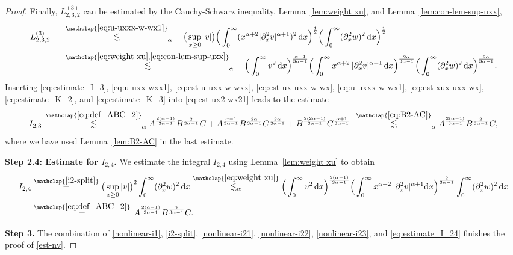 \documentclass[reqno,12pt]{amsart}
\renewcommand{\d}{\ensuremath{\mathrm{d}}}
\renewcommand{\d}{\ensuremath{{\rm d}}}
\numberwithin{equation}{section}
\begin{document}
\begin{proof}
Finally, $ L_{2,3,2}^{(3)}$ can be estimated by the Cauchy-Schwarz inequality, Lemma~\ref{lem:weight xu}, and Lemma~\ref{lem:con-lem-sup-uxx},
\begin{align} \label{eq:estimate_K_3}
  L_{2,3,2}^{(3)} \;
    \quad\;&\stackrel{\mathclap{\eqref{eq:u-uxxx-w-wx1}}}{\lesssim}_{\alpha}\quad \big(\sup_{x \ge 0} |v|\big) \Big(\int_0^\infty (x^{\alpha+2} |\partial_x^2 v|^{\alpha+1})^2 \, \d x\Big)^{\frac 1 2} \Big(\int_0^\infty (\partial_x^2 w)^2 \, \d x\Big)^{\frac 1 2} \nonumber \\
    &\stackrel{\mathclap{\eqref{eq:weight xu},\eqref{eq:con-lem-sup-uxx}}}{\lesssim}_\alpha \quad 
    \Big(\int_0^\infty v^2\, \d x\Big)^\frac{\alpha-1}{3\alpha-1}
    \Big(  \int_0^\infty x^{\alpha +2} \, |\partial_x^2 v|^{\alpha +1} \, \d x\Big)^{\frac{2\alpha}{3\alpha-1}}
    \Big( \int_0^\infty (\partial_x^2 w)^2 \, \d x\Big)^{\frac{2\alpha}{3\alpha-1}}.
\end{align}
%
Inserting \eqref{eq:estimate_I_3}, \eqref{eq:u-uxx-wxx1}, \eqref{eq:est-u-uxx-w-wxx}, \eqref{eq:est-ux-uxx-w-wx}, \eqref{eq:u-uxxx-w-wx1}, \eqref{eq:est-xux-uxx-wx}, \eqref{eq:estimate_K_2}, and \eqref{eq:estimate_K_3} into \eqref{eq:est-ux2-wx21} leads to the estimate
%
\begin{equation}\label{nonlinear-i23}
    I_{2,3}
    \, \stackrel{\mathclap{\eqref{eq:def_ABC_2}}}{\lesssim}_{\alpha}
    A^\frac{2(\alpha-1)}{3\alpha-1} B^\frac{2}{3\alpha-1}
    C
    +
    A^\frac{\alpha-1}{3\alpha-1}
    B^{\frac{2\alpha}{3\alpha-1}}
    C^{\frac{2\alpha}{3\alpha-1}} 
    +
    B^{\frac{2(2\alpha-1)}{3\alpha-1}}
    C^{\frac{\alpha+1}{3\alpha-1}} \;\, \stackrel{\mathclap{\eqref{eq:B2-AC}}}{\lesssim}_\alpha A^\frac{2(\alpha-1)}{3\alpha-1} B^\frac{2}{3\alpha-1}
    C,
\end{equation}
%
where we have used Lemma~\ref{lem:B2-AC} in the last estimate.

%
\bigskip
%

\noindent\textbf{Step 2.4: Estimate for $I_{2,4}$. }
We estimate the integral $I_{2,4}$ using Lemma~\ref{lem:weight xu} to obtain 
%
\begin{align} \label{eq:estimate_I_24}
    I_{2,4}
    &\stackrel{\mathclap{\eqref{i2-split}}}{=}
    \big(\sup_{x\geq 0} |v|\big)^2 \int_0^\infty (\partial_x^2 w)^2\, \d x
    \stackrel{\mathclap{\eqref{eq:weight xu}}}{\lesssim_{\alpha}}
    \Big(\int_0^\infty v^2\, \d x\Big)^\frac{2(\alpha-1)}{3\alpha-1}
    \Big(\int_0^\infty x^{\alpha+2}\, |\partial_x^2 v|^{\alpha+1} \d x\Big)^\frac{2}{3\alpha-1}
    \int_0^\infty (\partial_x^2 w)^2\, \d x
    \nonumber\\
    &\stackrel{\mathclap{\eqref{eq:def_ABC_2}}}{=} \, 
    A^\frac{2(\alpha-1)}{3\alpha-1}
    B^\frac{2}{3\alpha-1}
    C.
\end{align}
%

%
\bigskip
%

\noindent\textbf{Step 3. }
The combination of \eqref{nonlinear-i1}, \eqref{i2-split}, \eqref{nonlinear-i21}, \eqref{nonlinear-i22}, \eqref{nonlinear-i23}, and \eqref{eq:estimate_I_24} finishes the proof of \eqref{est-nv}.
\end{proof}
%
\end{document}
